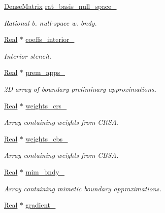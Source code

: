 \begin{DoxyCompactItemize}
\hyperlink{classmtk_1_1DenseMatrix}{Dense\-Matrix} \hyperlink{classmtk_1_1Grad1D_a21a2941a03ae8fbf24d880660acf3db5}{rat\-\_\-basis\-\_\-null\-\_\-space\-\_\-}
\begin{DoxyCompactList}\small\item\em Rational b. null-\/space w. bndy. \end{DoxyCompactList}\item 
\hyperlink{group__c01-roots_gac080bbbf5cbb5502c9f00405f894857d}{Real} $\ast$ \hyperlink{classmtk_1_1Grad1D_a2395861161c26f237e892aacebcc1909}{coeffs\-\_\-interior\-\_\-}
\begin{DoxyCompactList}\small\item\em Interior stencil. \end{DoxyCompactList}\item 
\hyperlink{group__c01-roots_gac080bbbf5cbb5502c9f00405f894857d}{Real} $\ast$ \hyperlink{classmtk_1_1Grad1D_aee092221dd2a496e0d51883168035551}{prem\-\_\-apps\-\_\-}
\begin{DoxyCompactList}\small\item\em 2\-D array of boundary preliminary approximations. \end{DoxyCompactList}\item 
\hyperlink{group__c01-roots_gac080bbbf5cbb5502c9f00405f894857d}{Real} $\ast$ \hyperlink{classmtk_1_1Grad1D_a96914abea78528b32499963ce9bbe4a6}{weights\-\_\-crs\-\_\-}
\begin{DoxyCompactList}\small\item\em Array containing weights from C\-R\-S\-A. \end{DoxyCompactList}\item 
\hyperlink{group__c01-roots_gac080bbbf5cbb5502c9f00405f894857d}{Real} $\ast$ \hyperlink{classmtk_1_1Grad1D_ae6b0a908748923b2acd97e5bf7acc000}{weights\-\_\-cbs\-\_\-}
\begin{DoxyCompactList}\small\item\em Array containing weights from C\-B\-S\-A. \end{DoxyCompactList}\item 
\hyperlink{group__c01-roots_gac080bbbf5cbb5502c9f00405f894857d}{Real} $\ast$ \hyperlink{classmtk_1_1Grad1D_afcd61d362ba7b0f588645ab09c773432}{mim\-\_\-bndy\-\_\-}
\begin{DoxyCompactList}\small\item\em Array containing mimetic boundary approximations. \end{DoxyCompactList}\item 
\hyperlink{group__c01-roots_gac080bbbf5cbb5502c9f00405f894857d}{Real} $\ast$ \hyperlink{classmtk_1_1Grad1D_a024b84b1ea285c0c590eb42d40ff4469}{gradient\-\_\-}

\end{DoxyCompactItemize}
